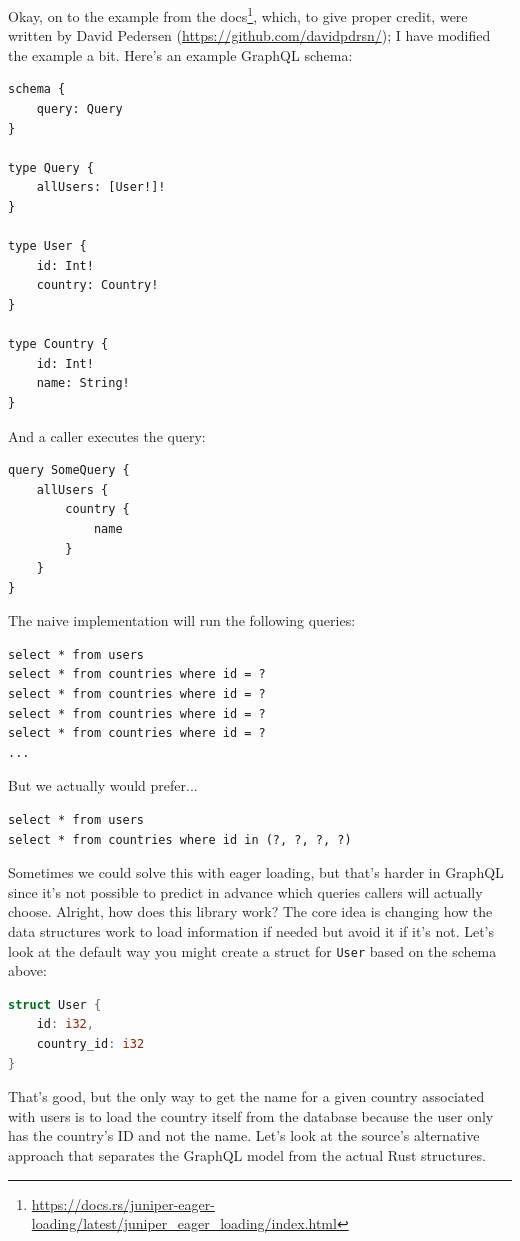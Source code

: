 Okay, on to the example from the docs\footnote{\url{https://docs.rs/juniper-eager-loading/latest/juniper_eager_loading/index.html}}, which, to give proper credit, were written by David Pedersen (\url{https://github.com/davidpdrsn/}); I have modified the example a bit. Here's an example GraphQL schema:

\begin{lstlisting}
schema {
    query: Query
}

type Query {
    allUsers: [User!]!
}

type User {
    id: Int!
    country: Country!
}

type Country {
    id: Int!
    name: String!
}
\end{lstlisting}

And a caller executes the query:
\begin{lstlisting}
query SomeQuery {
    allUsers {
        country {
            name
        }
    }
}
\end{lstlisting}

The naive implementation will run the following queries:
\begin{lstlisting}
select * from users
select * from countries where id = ?
select * from countries where id = ?
select * from countries where id = ?
select * from countries where id = ?
...
\end{lstlisting}

But we actually would prefer...
\begin{lstlisting}
select * from users
select * from countries where id in (?, ?, ?, ?)
\end{lstlisting}

Sometimes we could solve this with eager loading, but that's harder in GraphQL since it's not possible to predict in advance which queries callers will actually choose. Alright, how does this library work? The core idea is changing how the data structures work to load information if needed but avoid it if it's not. Let's look at the default way you might create a struct for \texttt{User} based on the schema above:

\begin{lstlisting}[language=Rust]
struct User {
    id: i32,
    country_id: i32
}
\end{lstlisting}
That's good, but the only way to get the name for a given country associated with users is to load the country itself from the database because the user only has the country's ID and not the name. Let's look at the source's alternative approach that separates the GraphQL model from the actual Rust structures.


